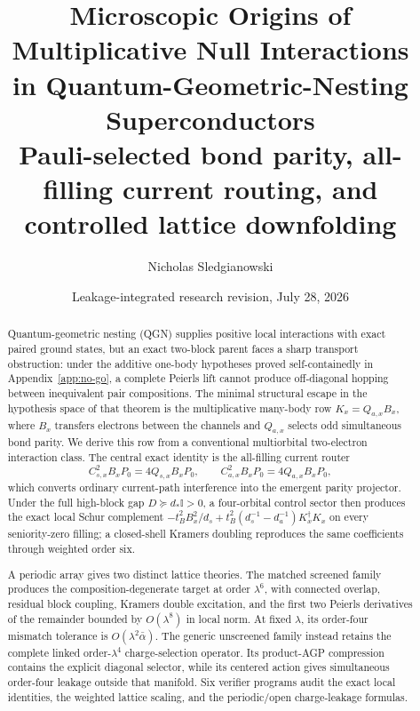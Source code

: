 \documentclass[11pt]{article}
\title{\textbf{Microscopic Origins of Multiplicative Null Interactions\\in Quantum-Geometric-Nesting Superconductors}\\[0.35em]
\large Pauli-selected bond parity, all-filling current routing, and controlled lattice downfolding}
\author{Nicholas Sledgianowski}
\date{Leakage-integrated research revision, July 28, 2026}
\theoremstyle{definition}
\theoremstyle{remark}
\begin{document}
\maketitle

\begin{abstract}
Quantum-geometric nesting (QGN) supplies positive local interactions with exact paired ground states, but an exact two-block parent faces a sharp transport obstruction: under the additive one-body hypotheses proved self-containedly in Appendix~\ref{app:no-go}, a complete Peierls lift cannot produce off-diagonal hopping between inequivalent pair compositions.  The minimal structural escape in the hypothesis space of that theorem is the multiplicative many-body row $K_x=Q_{a,x}B_x$, where $B_x$ transfers electrons between the channels and $Q_{a,x}$ selects odd simultaneous bond parity.  We derive this row from a conventional multiorbital two-electron interaction class.  The central exact identity is the all-filling current router
\[
 C_{s,x}^{2}B_xP_0=4Q_{s,x}B_xP_0,
 \qquad
 C_{a,x}^{2}B_xP_0=4Q_{a,x}B_xP_0,
\]
which converts ordinary current-path interference into the emergent parity projector.  Under the full high-block gap $D\succeq d_*\mathbb I>0$, a four-orbital control sector then produces the exact local Schur complement $-t_B^2B_x^2/d_s+t_B^2(d_s^{-1}-d_a^{-1})K_x^\dagger K_x$ on every seniority-zero filling; a closed-shell Kramers doubling reproduces the same coefficients through weighted order six.

A periodic array gives two distinct lattice theories.  The matched screened family produces the composition-degenerate target at order $\lambda^6$, with connected overlap, residual block coupling, Kramers double excitation, and the first two Peierls derivatives of the remainder bounded by $O(\lambda^8)$ in local norm.  At fixed $\lambda$, its order-four mismatch tolerance is $O(\lambda^2\bar\alpha)$.  The generic unscreened family instead retains the complete linked order-$\lambda^4$ charge-selection operator.  Its product-AGP compression contains the explicit diagonal selector, while its centered action gives simultaneous order-four leakage outside that manifold.  Six verifier programs audit the exact local identities, the weighted lattice scaling, and the periodic/open charge-leakage formulas.
\end{abstract}
\end{document}
